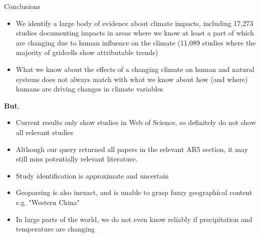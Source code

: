 \documentclass[9pt]{beamer}
\begin{document}
%
%			
%		
%

\begin{frame}{Conclusions}

\begin{itemize}
	\item We identify a large body of evidence about climate impacts, including 17,273 studies documenting impacts in areas where we know at least a part of which are changing due to human influence on the climate (11,089 studies where the majority of gridcells show attributable trends)
	\item What we know about the effects of a changing climate on human and natural systems does not always match with what we know about how (and where) humans are driving changes in climate variables 
\end{itemize}

\textbf{But}, 

\begin{itemize}
	\item Current results only show studies in Web of Science, so definitely do not show all relevant studies
	\item Although our query returned all papers in the relevant AR5 section, it may still miss potentially relevant literature.
	\item Study identification is approximate and uncertain
	\item Geoparsing is also inexact, and is unable to grasp fuzzy geographical content e.g. "Western China"
	\item In large parts of the world, we do not even know reliably if precipitation and temperature are changing
\end{itemize}

\end{frame}
\end{document}
